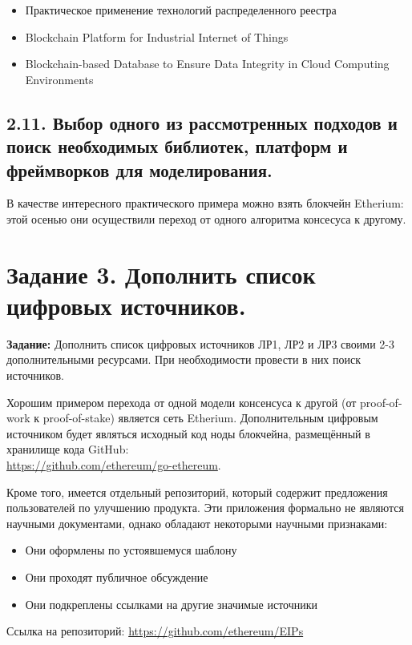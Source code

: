 \documentclass[a4paper, 12pt]{report}		%
\begin{document}
\begin{itemize}
\item Практическое применение технологий распределенного реестра
\item Blockchain Platform for Industrial Internet of Things
\item Blockchain-based Database to Ensure Data Integrity in Cloud Computing Environments
\end{itemize}

\section*{2.11. Выбор одного из рассмотренных подходов и поиск необходимых библиотек, платформ и фреймворков для моделирования.}

В качестве интересного практического примера можно взять блокчейн Etherium: этой осенью они осуществили переход от одного алгоритма консесуса к другому.


\chapter*{Задание 3. Дополнить список цифровых источников.}

\textbf{Задание:} Дополнить список цифровых источников ЛР1, ЛР2 и ЛР3 своими 2-3 дополнительными ресурсами. При необходимости провести в них поиск источников.

\vspace{1cm}

Хорошим примером перехода от одной модели консенсуса к другой (от proof-of-work к proof-of-stake) является сеть Etherium. Дополнительным цифровым источником будет являться исходный код ноды блокчейна, размещённый в хранилище кода GitHub:\\
\url{https://github.com/ethereum/go-ethereum}.

Кроме того, имеется отдельный репозиторий, который содержит предложения пользователей по улучшению продукта. Эти приложения формально не являются научными документами, однако обладают некоторыми научными признаками:
\begin{itemize}
\item Они оформлены по устоявшемуся шаблону
\item Они проходят публичное обсуждение
\item Они подкреплены ссылками на другие значимые источники
\end{itemize}
Ссылка на репозиторий: \url{https://github.com/ethereum/EIPs}
\end{document}

